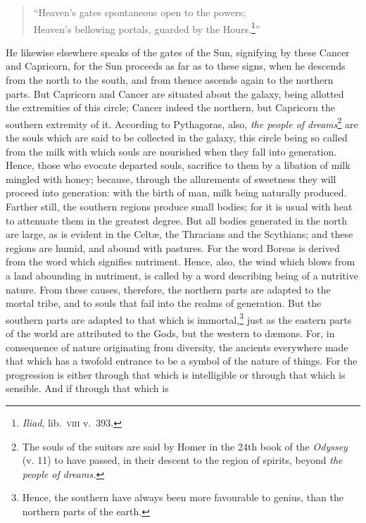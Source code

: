 \documentclass[a4paper,12pt]{article}
\begin{document}
\begin{verse}
``Heaven's gates spontaneous open to the powers;\\
Heaven's bellowing portals, guarded by the Hours.\footnote{\textit{Iliad}, lib.~\textsc{viii} v.~393.}''
\end{verse}

\noindent He likewise elsewhere speaks of the gates of the Sun, signifying by
these Cancer and Capricorn, for the Sun proceeds as far as to these signs, when
he descends from the north to the south, and from thence ascends again to the
northern parts. But Capricorn and Cancer are situated about the galaxy, being
allotted the extremities of this circle; Cancer indeed the northern, but
Capricorn the southern extremity of it. According to Pythagoras, also,
\textit{the people of dreams}\footnote{The souls of the suitors are said by
Homer in the 24th book of the \textit{Odyssey} (v. 11) to have passed, in their
descent to the region of spirits, beyond \textit{the people of dreams.}} are
the souls which are said to be collected in the galaxy, this circle being so
called from the milk with which souls are nourished when they fall into
generation. Hence, those who evocate departed souls, sacrifice to them by a
libation of milk mingled with honey; because, through the allurements of
sweetness they will proceed into generation: with the birth of man, milk being
naturally produced.  Farther still, the southern regions produce small bodies;
for it is usual with heat to attenuate them in the greatest degree. But all
bodies generated in the north are large, as is evident in the Celt{\ae}, the
Thracians and the Scythians; and these regions are humid, and abound with
pastures. For the word Boreas is derived from the word which signifies
nutriment. Hence, also, the wind which blows from a land abounding in
nutriment, is called by a word describing being of a nutritive nature. From
these causes, therefore, the northern parts are adapted to the mortal tribe,
and to souls that fail into the realms of generation. But the southern parts
are adapted to that which is immortal,\footnote{Hence, the southern have always
been more favourable to genius, than the northern parts of the earth.} just as
the eastern parts of the world are attributed to the Gods, but the western to
d{\ae}mons. For, in consequence of nature originating from diversity, the
ancients everywhere made that which has a twofold entrance to be a symbol of
the nature of things. For the progression is either through that which is
intelligible or through that which is sensible. And if through that which is
\end{document}
